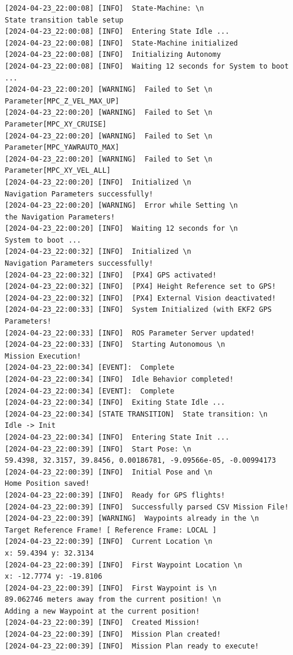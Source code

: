 \begin{lstlisting}
[2024-04-23_22:00:08] [INFO]  State-Machine: \n 
State transition table setup
[2024-04-23_22:00:08] [INFO]  Entering State Idle ...
[2024-04-23_22:00:08] [INFO]  State-Machine initialized
[2024-04-23_22:00:08] [INFO]  Initializing Autonomy
[2024-04-23_22:00:08] [INFO]  Waiting 12 seconds for System to boot ... 
[2024-04-23_22:00:20] [WARNING]  Failed to Set \n 
Parameter[MPC_Z_VEL_MAX_UP]
[2024-04-23_22:00:20] [WARNING]  Failed to Set \n 
Parameter[MPC_XY_CRUISE]
[2024-04-23_22:00:20] [WARNING]  Failed to Set \n 
Parameter[MPC_YAWRAUTO_MAX]
[2024-04-23_22:00:20] [WARNING]  Failed to Set \n 
Parameter[MPC_XY_VEL_ALL]
[2024-04-23_22:00:20] [INFO]  Initialized \n 
Navigation Parameters successfully!
[2024-04-23_22:00:20] [WARNING]  Error while Setting \n 
the Navigation Parameters!
[2024-04-23_22:00:20] [INFO]  Waiting 12 seconds for \n 
System to boot ... 
[2024-04-23_22:00:32] [INFO]  Initialized \n 
Navigation Parameters successfully!
[2024-04-23_22:00:32] [INFO]  [PX4] GPS activated!
[2024-04-23_22:00:32] [INFO]  [PX4] Height Reference set to GPS!
[2024-04-23_22:00:32] [INFO]  [PX4] External Vision deactivated!
[2024-04-23_22:00:33] [INFO]  System Initialized (with EKF2 GPS Parameters!
[2024-04-23_22:00:33] [INFO]  ROS Parameter Server updated!
[2024-04-23_22:00:33] [INFO]  Starting Autonomous \n 
Mission Execution!
[2024-04-23_22:00:34] [EVENT]:  Complete
[2024-04-23_22:00:34] [INFO]  Idle Behavior completed!
[2024-04-23_22:00:34] [EVENT]:  Complete
[2024-04-23_22:00:34] [INFO]  Exiting State Idle ...
[2024-04-23_22:00:34] [STATE TRANSITION]  State transition: \n 
Idle -> Init
[2024-04-23_22:00:34] [INFO]  Entering State Init ...
[2024-04-23_22:00:39] [INFO]  Start Pose: \n 
59.4398, 32.3157, 39.8456, 0.00186781, -9.09566e-05, -0.00994173
[2024-04-23_22:00:39] [INFO]  Initial Pose and \n 
Home Position saved!
[2024-04-23_22:00:39] [INFO]  Ready for GPS flights!
[2024-04-23_22:00:39] [INFO]  Successfully parsed CSV Mission File!
[2024-04-23_22:00:39] [WARNING]  Waypoints already in the \n 
Target Reference Frame! [ Reference Frame: LOCAL ]
[2024-04-23_22:00:39] [INFO]  Current Location \n 
x: 59.4394 y: 32.3134
[2024-04-23_22:00:39] [INFO]  First Waypoint Location \n 
x: -12.7774 y: -19.8106
[2024-04-23_22:00:39] [INFO]  First Waypoint is \n 
89.062746 meters away from the current position! \n 
Adding a new Waypoint at the current position!
[2024-04-23_22:00:39] [INFO]  Created Mission!
[2024-04-23_22:00:39] [INFO]  Mission Plan created!
[2024-04-23_22:00:39] [INFO]  Mission Plan ready to execute!

\end{lstlisting}
